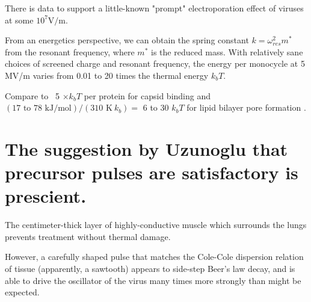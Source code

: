 \documentclass[fleqn,10pt]{paper}
\begin{document}
There is data to support a little-known "prompt" electroporation effect of viruses at 
some $10^7 \text{V/m}$.

From an energetics perspective, we can obtain the spring constant $k = \omega_{res}^2 m^*$ from the resonant frequency, where $m^*$ is the reduced mass. With relatively sane choices of screened charge and resonant frequency, the energy per monocycle at 5 MV/m varies from 0.01 to 20 times the thermal energy $k_b T$. 

Compare to ~5 $\times k_b T$ per protein for capsid binding \cite{Energies2012} \cite{Weak2002} and $ (\text{17 to 78 kJ/mol})  / (310 \text{ K}\ k_b) = $ 6 to 30 $k_b T$ for lipid bilayer pore formation \cite{Atomistic2014a}.




\section{The suggestion by Uzunoglu that precursor pulses are satisfactory is prescient.} 

The centimeter-thick layer of highly-conductive muscle which surrounds the lungs prevents treatment 
without thermal damage.
 
However, a carefully shaped pulse that matches the Cole-Cole dispersion relation of tissue 
(apparently, a sawtooth) appears to side-step Beer's law decay, and is able to drive the oscillator of the virus many times more strongly than might be expected.
\end{document}
